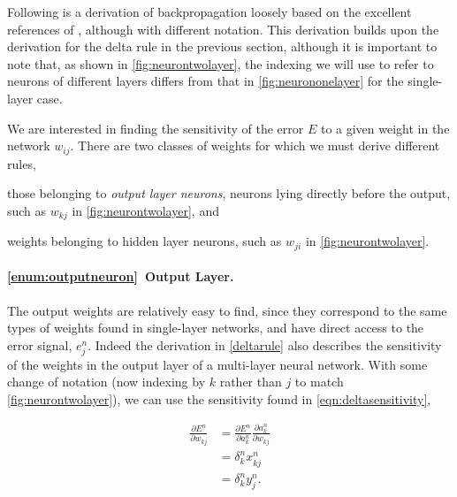 \documentclass[thesis]{subfiles}
\begin{document}
Following is a derivation of backpropagation loosely based on the excellent references of \citet{haykin1994neural,Bishop1995}, although with different notation. This derivation builds upon the derivation for the delta rule in the previous section, although it is important to note that, as shown in \cref{fig:neurontwolayer}, the indexing we will use to refer to neurons of different layers differs from that in \cref{fig:neurononelayer} for the single-layer case.

We are interested in finding the sensitivity of the error $E$ to a given weight in the network $w_{ij}$. There are two classes of weights for which we must derive different rules, 
\begin{enumerate*}[label= (\textbf{\roman*})]
  \item\label{enum:outputneuron} those belonging to \emph{output layer neurons}, \ie{}neurons lying directly before the output, such as $w_{kj}$ in \cref{fig:neurontwolayer}, and
  \item\label{enum:hiddenneuron} weights belonging to hidden layer neurons, such as $w_{ji}$ in \cref{fig:neurontwolayer}.
\end{enumerate*}

\paragraph{\ref{enum:outputneuron}~Output Layer.}
The output weights are relatively easy to find, since they correspond to the same types of weights found in single-layer networks, and have direct access to the error signal, \ie$e^n_j$. Indeed the derivation in \cref{deltarule} also describes the sensitivity of the weights in the output layer of a multi-layer neural network. With some change of notation (now indexing by $k$ rather than $j$ to match \cref{fig:neurontwolayer}), we can use the sensitivity found in \cref{eqn:deltasensitivity},

\begin{equation}
\begin{aligned}
    \frac{\partial E^n}{\partial w_{kj}} &= \frac{\partial E^n}{\partial a^n_k} \frac{\partial a^n_k}{\partial w_{kj}}\\
    &= \delta^n_k x^n_{kj}\\
    &= \delta^n_k y^n_j.
\end{aligned}
\label{eqn:outputlayer}
\end{equation}
\end{document}
